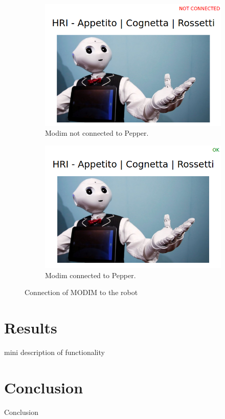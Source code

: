 \documentclass[12pt, letterpaper, twoside]{article}
\begin{document}
\begin{figure}[h]
	\centering
	\begin{subfigure}{.5\textwidth}
	  \centering
	  \includegraphics[width=1\linewidth]{img/modim_notok.png}
	  \caption{Modim not connected to Pepper.}
	  \label{fig:sub1}
	\end{subfigure}%
	\begin{subfigure}{.5\textwidth}
	  \centering
	  \includegraphics[width=1\linewidth]{img/modim_ok.png}
	  \caption{Modim connected to Pepper.}
	  \label{fig:sub2}
	\end{subfigure}
	\caption{Connection of MODIM to the robot}
	\label{fig:test}
\end{figure}

\newpage

\section{Results}

mini description of functionality

\section{Conclusion}

Conclusion
\end{document}
